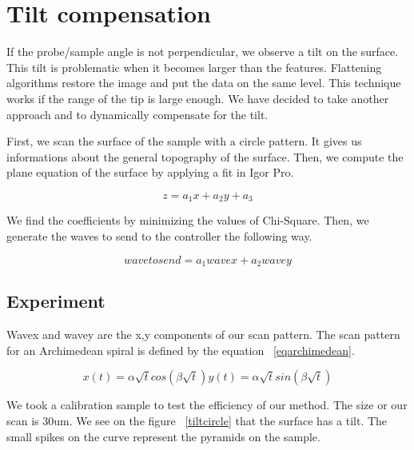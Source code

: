 \section{Tilt compensation}

If the probe/sample angle is not perpendicular, we observe a tilt on the surface. This tilt is problematic when it becomes larger than the features. Flattening algorithms restore the image and put the data on the same level. This technique works if the range of the tip is large enough. We have decided to take another approach and to dynamically compensate for the tilt.

First, we scan the surface of the sample with a circle pattern. It gives us informations about the general topography of the surface. Then, we compute the plane equation of the surface by applying a fit in Igor Pro.

\begin{equation}\label{eqn:planeeq}
z = a_1 x + a_2 y + a_3 
\end{equation}

We find the coefficients by minimizing the values of Chi-Square. Then, we generate the waves to send to the controller the following way.

\begin{equation}\label{eqn:sendwave}
wavetosend = a_1 wavex + a_2 wavey 
\end{equation}

\subsection{Experiment}

Wavex and wavey are the x,y components of our scan pattern. The scan pattern for an Archimedean spiral is defined by the equation  ~\ref{eqarchimedean}.

\begin{equation}\label{eqarchimedean}
x(t)= \alpha \sqrt{t} cos(\beta \sqrt{t})
y(t)= \alpha \sqrt{t} sin(\beta \sqrt{t})
\end{equation}

We took a calibration sample to test the efficiency of our method. The size or our scan is 30um. We see on the figure  ~\ref{tiltcircle} that the surface has a tilt. The small spikes on the curve represent the pyramids on the sample.


